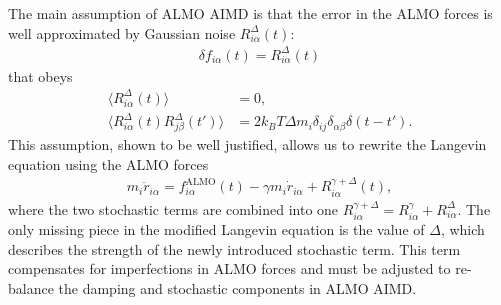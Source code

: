 \documentclass[aps,prl,reprint,amsmath,amssymb]{revtex4-1}
\begin{document}
The main assumption of ALMO AIMD is that the error in the ALMO forces is well approximated by Gaussian noise $R^{\Delta}_{i\alpha} (t)$:
%
\begin{align}
\label{eq:assumption}
\delta f_{i\alpha}(t) = R^{\Delta}_{i\alpha} (t)
\end{align}
%
that obeys
%
\begin{align}
\label{eq:stochastic2}
\langle R^{\Delta}_{i\alpha} (t) \rangle &= 0, \\
\label{eq:stochastic3}
\langle R^{\Delta}_{i\alpha} (t)  R^{\Delta}_{j\beta} (t') \rangle &= 2 k_B T \Delta m_i \delta_{ij} \delta_{\alpha\beta} \delta(t-t') .
\end{align}
%
This assumption, shown to be well justified, allows us to rewrite the Langevin equation using the ALMO forces
%
\begin{align}
\label{eq:langevin2}
m_i \ddot{r}_{i\alpha} = f^{\text{ALMO}}_{i\alpha}(t) - \gamma m_i \dot{r}_{i\alpha} + R^{\gamma + \Delta}_{i\alpha} (t),
\end{align}
%
where the two stochastic terms are combined into one $R^{\gamma + \Delta}_{i\alpha} = R^{\gamma}_{i\alpha} + R^{\Delta}_{i\alpha}$. 
The only missing piece in the modified Langevin equation is the value of $\Delta$, which describes the strength of the newly introduced stochastic term. 
This term compensates for imperfections in ALMO forces and must be adjusted to re-balance the damping and stochastic components in ALMO AIMD.


\end{document}
